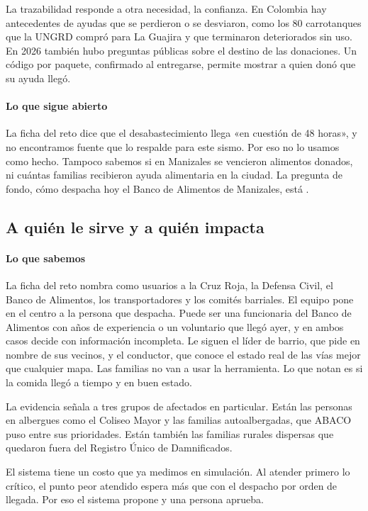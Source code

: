 La trazabilidad responde a otra necesidad, la confianza. En Colombia hay antecedentes de ayudas que se perdieron o se desviaron, como los 80 carrotanques que la UNGRD compró para La Guajira y que terminaron deteriorados sin uso. En 2026 también hubo preguntas públicas sobre el destino de las donaciones. Un código por paquete, confirmado al entregarse, permite mostrar a quien donó que su ayuda llegó.

\paragraph{Lo que sigue abierto} La ficha del reto dice que el desabastecimiento llega «en cuestión de 48 horas», y no encontramos fuente que lo respalde para este sismo. Por eso no lo usamos como hecho. Tampoco sabemos si en Manizales se vencieron alimentos donados, ni cuántas familias recibieron ayuda alimentaria en la ciudad. La pregunta de fondo, cómo despacha hoy el Banco de Alimentos de Manizales, está \pendiente.

\subsection{A quién le sirve y a quién impacta}

\paragraph{Lo que sabemos} La ficha del reto nombra como usuarios a la Cruz Roja, la Defensa Civil, el Banco de Alimentos, los transportadores y los comités barriales. El equipo pone en el centro a la persona que despacha. Puede ser una funcionaria del Banco de Alimentos con años de experiencia o un voluntario que llegó ayer, y en ambos casos decide con información incompleta. Le siguen el líder de barrio, que pide en nombre de sus vecinos, y el conductor, que conoce el estado real de las vías mejor que cualquier mapa. Las familias no van a usar la herramienta. Lo que notan es si la comida llegó a tiempo y en buen estado.

La evidencia señala a tres grupos de afectados en particular. Están las personas en albergues como el Coliseo Mayor y las familias autoalbergadas, que ABACO puso entre sus prioridades. Están también las familias rurales dispersas que quedaron fuera del Registro Único de Damnificados.

El sistema tiene un costo que ya medimos en simulación. Al atender primero lo crítico, el punto peor atendido espera más que con el despacho por orden de llegada. Por eso el sistema propone y una persona aprueba.

